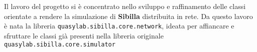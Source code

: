 
Il lavoro del progetto si è concentrato nello sviluppo e raffinamento delle classi orientate a rendere la simulazione di \textbf{Sibilla} distribuita in rete.
Da questo lavoro è nata la libreria \texttt{quasylab.sibilla.core.network}, ideata per affiancare e sfruttare le classi già presenti nella libreria originale \texttt{quasylab.sibilla.core.simulator}